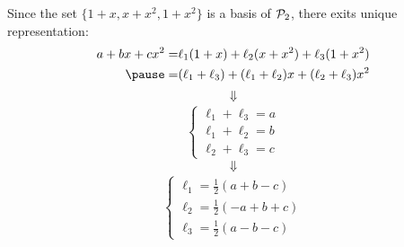 \documentclass[pdf,9pt]{beamer}
\begin{document}
\begin{frame}[fragile]
\begin{solution}
Since the set $\{1 + x, x + x^{2}, 1 + x^{2}\}$ is a basis of ${\cal P}_{2}$, there exits unique representation:
\begin{align*}
    a+bx+cx^2 = & \ell_1 (1+x) + \ell_2(x+x^2) + \ell_3(1+x^2) \\ \pause
              = & (\ell_1+\ell_3) + (\ell_1+\ell_2)x + (\ell_2+\ell_3)x^2
\end{align*}
\[\Downarrow\]
\begin{align*}
    \begin{cases}
        \ell_1+\ell_3 = a\\
        \ell_1+\ell_2=b\\
        \ell_2+\ell_3=c
    \end{cases}
\end{align*}
\[\Downarrow\]
\begin{align*}
\begin{cases}
    \ell_1=\frac{1}{2}(a+b-c) \\
    \ell_2=\frac{1}{2}(-a+b+c) \\
    \ell_3=\frac{1}{2}(a-b-c)
\end{cases}
\end{align*}
\end{solution}
\end{frame}
\end{document}
